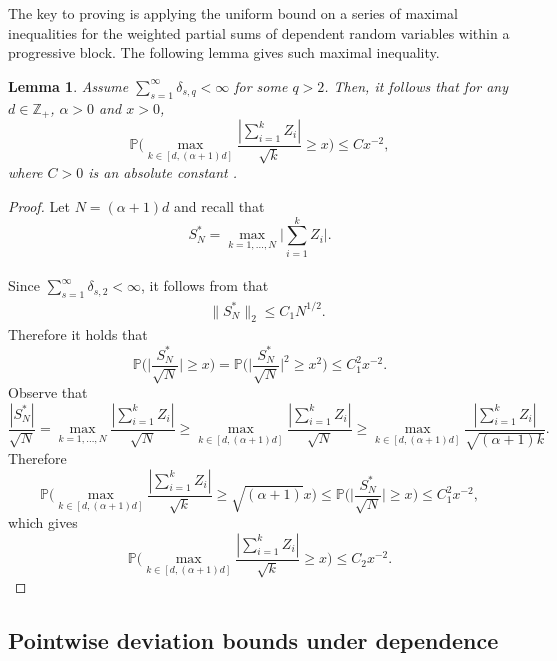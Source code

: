 \documentclass[11pt]{article}
\newcommand{\p}{\mathbb P}
\theoremstyle{plain}
\newtheorem{lemma}[theorem]{Lemma}
\theoremstyle{definition}
\begin{document}
The key to proving  is applying the uniform bound on a series of maximal inequalities for the weighted partial sums of dependent random variables within a progressive block. The following lemma gives such maximal inequality.
\begin{lemma} \label{lemma:sup is stopping time}
Assume $\sum_{s=1}^\infty   \delta _{s,q  } < \infty$ for some $q > 2$. Then, it follows that for any $d \in \mathbb{Z}_+$, $\alpha>0$ and $ x>0$, 
$$  \p \bigg (  \max_{ k \in [d, (\alpha+1) d ]}    \frac{| \sum_{i=1}^k    Z_i  | }{ \sqrt { k  }  }  \ge   x \bigg )\le Cx^{-2} ,    $$
where $C > 0$ is an absolute constant .
\end{lemma}   
\begin{proof} 
Let $N = (\alpha+1 )d $ and recall that
$$ S_N^*=  \max_{k=1,\ldots, N} \bigg|  \sum_{i=1}^k    Z_i \bigg|  .   $$
\
\\
Since $\sum_{s=1}^\infty   \delta _{s,2  } < \infty$, it follows from  that
 \begin{align*}  
    \quad  \| S^*_N\|_2  \le   C _1 N^{1/2}  .
   \end{align*} 
 Therefore   it holds that 
$$ \p \bigg (  \bigg | \frac{ S^*_N}{\sqrt N } \bigg |\ge x \bigg ) =
\p \bigg (  \bigg | \frac{ S^*_N}{\sqrt N } \bigg |^2 \ge x ^2  \bigg ) \le C_1^2x^{-2}  . $$
Observe  that 
$$  \frac{ |S_N^* | }{\sqrt N }=  \max_{k=1,\ldots, N}  \frac{ | \sum_{i=1}^k    Z_i  | }{ \sqrt N }    \ge  \max_{ k \in [d, (\alpha+1) d ]}    \frac{| \sum_{i=1}^k    Z_i  | }{ \sqrt N  }  \ge  \max_{ k \in [d, (\alpha+1) d ]}    \frac{| \sum_{i=1}^k    Z_i  | }{ \sqrt { (\alpha + 1 ) k  }  }  .  $$ 
Therefore 
$$ \p \bigg (  \max_{ k \in [d, (\alpha+1) d ]}    \frac{| \sum_{i=1}^k    Z_i  | }{ \sqrt { k  }  }  \ge  \sqrt { (\alpha + 1 ) }x \bigg ) \le  \p \bigg (  \bigg | \frac{ S^*_N}{\sqrt N } \bigg |\ge x \bigg ) \le  C_1^2x^{-2}   , $$
which gives 
$$ \p \bigg (  \max_{ k \in [d, (\alpha+1) d ]}    \frac{| \sum_{i=1}^k    Z_i  | }{ \sqrt { k  }  }  \ge   x \bigg )\le  C_2x^{-2}  . $$ 
\end{proof}


 \subsection{Pointwise deviation bounds under dependence}
 
\end{document}
